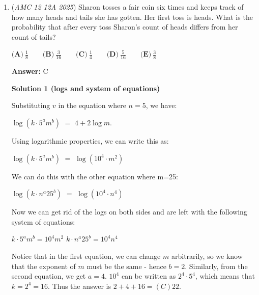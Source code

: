\begin{enumerate}
 Case 2: The first teacher sits away from the two students. This can also happen $\frac{1}{2}$ of the time and the other teacher has a $\frac{2}{3}$ chance of sitting next to the first one. This gives us a $\frac{1}{2} \cdot \frac{2}{3} = \frac{1}{3}$ chance for the second case.

 Now, we can find the desired probability as: $(\frac{1}{3} + \frac{1}{6}) \cdot \frac{2}{5} = \frac{1}{2} \cdot \frac{2}{5} = \boxed{\frac{1}{5}}$

 \href{https://y.o.u.t.u.b.e/5Fjos1vBt0A}{https://y.o.u.t.u.b.e/5Fjos1vBt0A}

 


	\item (\textit{AMC 12 12A 2025}) Sharon tosses a fair coin six times and keeps track of how many heads and tails she has gotten. Her first toss is heads. What is the probability that after every toss Sharon's count of heads differs from her count of tails?


 $\textbf{(A)}\   \frac{1}{8}  \qquad                 \textbf{(B)}\   \frac{3}{16}  \qquad                 \textbf{(C)}\   \frac{1}{4}  \qquad                 \textbf{(D)}\   \frac{5}{16}  \qquad                 \textbf{(E)}\   \frac{3}{8}$

 \textbf{Answer: }C



\textbf{Solution 1 (logs and system of equations)}

Substituting $v$ in the equation where $n=5$, we have:

 $\log(k \cdot 5^a m^b)$ $=$ $4+2\log m$.

 Using logarithmic properties, we can write this as:

 $\log(k \cdot 5^a m^b)$ $=$ $\log(10^4 \cdot m^2)$

 We can do this with the other equation where m=25:

 $\log(k \cdot n^a 25^b)$ $=$ $\log(10^4 \cdot n^4)$

 Now we can get rid of the logs on both sides and are left with the following system of equations:

 $k \cdot 5^am^b = 10^4 m^2$
$k \cdot n^a25^b = 10^4 n^4$

 Notice that in the first equation, we can change $m$ arbitrarily, so we know that the exponent of $m$ must be the same - hence $b=2$. Similarly, from the second equation, we get $a=4$. $10^4$ can be written as $2^4 \cdot 5^4$, which means that $k=2^4 = 16$. Thus the answer is $2+4+16 = \boxed{(C)  22}$.


\end{enumerate}
